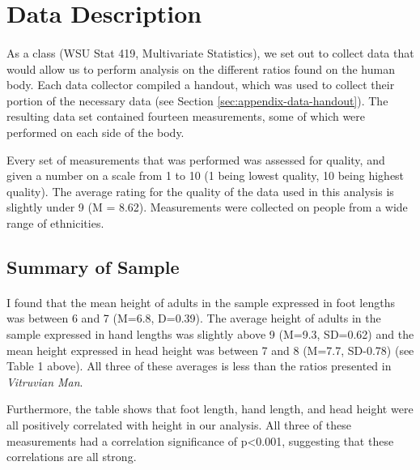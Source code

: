 \documentclass[]{article}
\begin{document}
\section{Data Description}
\label{sec:data}

\paragraph{}

As a class (WSU Stat 419, Multivariate Statistics), we set out to
collect data that would allow us to perform analysis on the different
ratios found on the human body. Each data collector compiled a handout,
which was used to collect their portion of the necessary data (see
Section \ref{sec:appendix-data-handout}). The resulting data set
contained fourteen measurements, some of which were performed on each
side of the body.

Every set of measurements that was performed was assessed for quality,
and given a number on a scale from 1 to 10 (1 being lowest quality, 10
being highest quality). The average rating for the quality of the data
used in this analysis is slightly under 9 (M = 8.62). Measurements were
collected on people from a wide range of ethnicities.



\label{table}

\subsection{Summary of Sample}
\label{sec:data-sample}
\paragraph{}

I found that the mean height of adults in the sample expressed in foot
lengths was between 6 and 7 (M=6.8, D=0.39). The average height of
adults in the sample expressed in hand lengths was slightly above 9
(M=9.3, SD=0.62) and the mean height expressed in head height was
between 7 and 8 (M=7.7, SD-0.78) (see Table 1 above). All three of these
averages is less than the ratios presented in \emph{Vitruvian Man}.

Furthermore, the table shows that foot length, hand length, and head
height were all positively correlated with height in our analysis. All
three of these measurements had a correlation significance of
p\textless0.001, suggesting that these correlations are all strong.
\end{document}
